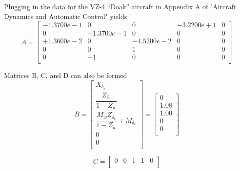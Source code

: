 \documentclass[12pt]{article}
\begin{document}
\noindent Plugging in the data for the VZ-4 ``Doak'' aircraft in Appendix A of "Aircraft Dynamics and Automatic Control" yields
\begin{equation*}
A =
\begin{bmatrix}
  -1.3700e-1 &          0 &          0 & -3.2200e+1 &           0 \\
           0 & -1.3700e-1 &          0 &          0 &           0 \\
  +1.3600e-2 &          0 & -4.5200e-2 &          0 &           0 \\
           0 &          0 & 1         &          0 &           0 \\
           0 & -1         &          0 &          0 &           0 \\
\end{bmatrix}
\end{equation*}

\noindent Matrices B, C, and D can also be formed
\begin{equation*}
B =
\begin{bmatrix}
   X_{\delta_e} \\
   \dfrac{Z_{\delta_e}}{1-Z_{\dot{w}}} \\
   \dfrac{M_{\dot{w}} Z_{\delta_e}}{1-Z_{\dot{w}}} + M_{\delta_e} \\
   0 \\
   0 \\
\end{bmatrix}
=
\begin{bmatrix}
            0 \\
         1.08 \\
         1.00 \\
            0 \\
            0 \\
\end{bmatrix}
\end{equation*}

\begin{equation*}
C =
\begin{bmatrix}
 0 &    0 &    1 &    1 &    0 \\
\end{bmatrix}
\end{equation*}
\end{document}
